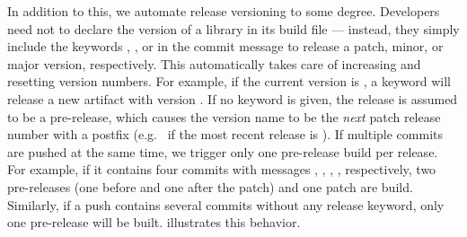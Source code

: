 In addition to this, we automate release versioning to some degree. Developers need not to declare the version of a library in its build file --- instead, they simply include the keywords , , or  in the commit message to release a patch, minor, or major version, respectively. This automatically takes care of increasing and resetting version numbers. For example, if the current version is , a  keyword will release a new artifact with version . If no keyword is given, the release is assumed to be a pre-release, which causes the version name to be the \emph{next} patch release number with a  postfix (e.g.\  if the most recent release is ). If multiple commits are pushed at the same time, we trigger only one pre-release build per release. For example, if it contains four commits with messages , , , , respectively, two pre-releases (one before and one after the patch) and one patch are build. Similarly, if a push contains several commits without any release keyword, only one pre-release will be built.  illustrates this behavior.

